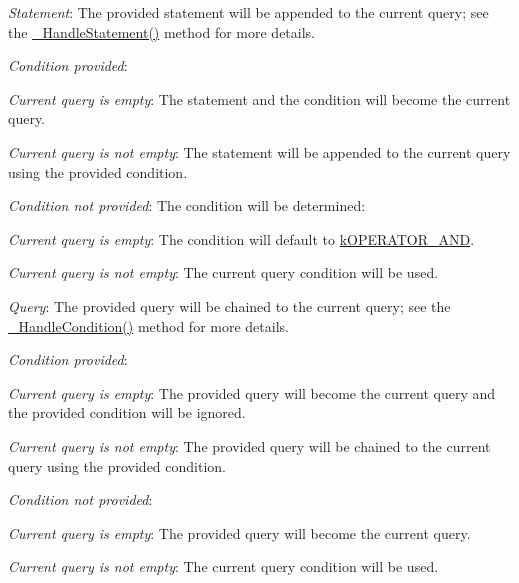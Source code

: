 \begin{DoxyItemize}
\item {\itshape Statement}\-: The provided statement will be appended to the current query; see the \hyperlink{class_c_query_aa6fb78916ebff1276c0fc06c0510c154}{\-\_\-\-Handle\-Statement()} method for more details. 
\begin{DoxyItemize}
\item {\itshape Condition provided}\-: 
\begin{DoxyItemize}
\item {\itshape Current query is empty}\-: The statement and the condition will become the current query. 
\item {\itshape Current query is not empty}\-: The statement will be appended to the current query using the provided condition. 
\end{DoxyItemize}
\item {\itshape Condition not provided}\-: The condition will be determined\-: 
\begin{DoxyItemize}
\item {\itshape Current query is empty}\-: The condition will default to \hyperlink{}{k\-O\-P\-E\-R\-A\-T\-O\-R\-\_\-\-A\-N\-D}. 
\item {\itshape Current query is not empty}\-: The current query condition will be used. 
\end{DoxyItemize}
\end{DoxyItemize}
\item {\itshape Query}\-: The provided query will be chained to the current query; see the \hyperlink{class_c_query_aecc479899ce58dec7ad6ab4fc1818971}{\-\_\-\-Handle\-Condition()} method for more details. 
\begin{DoxyItemize}
\item {\itshape Condition provided}\-: 
\begin{DoxyItemize}
\item {\itshape Current query is empty}\-: The provided query will become the current query and the provided condition will be ignored. 
\item {\itshape Current query is not empty}\-: The provided query will be chained to the current query using the provided condition. 
\end{DoxyItemize}
\item {\itshape Condition not provided}\-: 
\begin{DoxyItemize}
\item {\itshape Current query is empty}\-: The provided query will become the current query. 
\item {\itshape Current query is not empty}\-: The current query condition will be used. 
\end{DoxyItemize}
\end{DoxyItemize}
\end{DoxyItemize}


